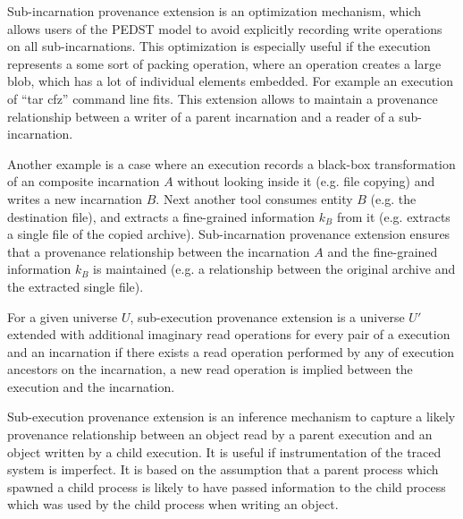 Sub-incarnation provenance extension is an optimization mechanism, which allows users of the PEDST model to avoid explicitly recording write operations on all sub-incarnations. This optimization is especially useful if the execution represents a some sort of packing operation, where an operation creates a large blob, which has a lot of individual elements embedded. For example an execution of ``tar cfz'' command line fits. This extension allows to maintain a provenance relationship between a writer of a parent incarnation and a reader of a sub-incarnation.

Another example is a case where an execution records a black-box transformation of an composite incarnation $A$ without looking inside it (e.g. file copying) and writes a new incarnation $B$. Next another tool consumes entity $B$ (e.g. the destination file), and extracts a fine-grained information $k_B$ from it (e.g. extracts a single file of the copied archive). Sub-incarnation provenance extension ensures that a provenance relationship between the incarnation $A$ and the fine-grained information $k_B$ is maintained (e.g. a relationship between the original archive and the extracted single file).

\begin{definition} For a given universe $U$, sub-execution provenance extension is a universe $U'$ extended with additional imaginary read operations for every pair of a execution and an incarnation if there exists a read operation performed by any of execution ancestors on the incarnation, a new read operation is implied between the execution and the incarnation.
\end{definition}

\begin{comment}
GP: Niezbyt ważne, nie będę opisywał.
\begin{definition}[Sub-execution provenance extension with time constraints] For a given universe $U$, sub-execution provenance extension is a universe $U'$ extended with additional imaginary read operations: a read operation is implied between a execution and an incarnation if (1) there exists a read operation performed by any of execution ancestors on the incarnation and (2) if the read original operation has happened before the given child execution creation timestamp.
\end{definition}
\end{comment}

Sub-execution provenance extension is an inference mechanism to capture a likely provenance relationship between an object read by a parent execution and an object written by a child execution. It is useful if instrumentation of the traced system is imperfect. It is based on the assumption that a parent process which spawned a child process is likely to have passed information to the child process which was used by the child process when writing an object.

